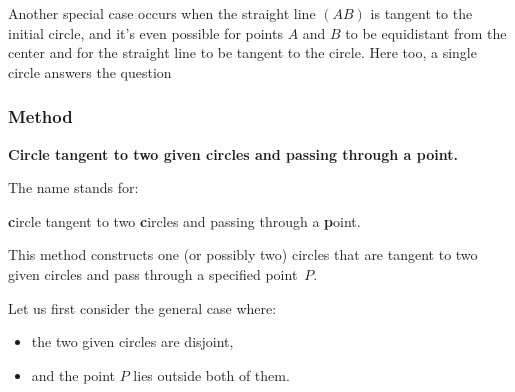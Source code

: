 Another special case occurs when the straight line $(AB)$ is tangent to the initial circle, and it's even possible for points $A$ and $B$ to be equidistant from the center and for the straight line to be tangent to the circle. Here too, a single circle answers the question

\begin{minipage}{.5\textwidth}
\end{minipage}
\begin{minipage}{.5\textwidth}
\begin{tkzexample}
\end{tkzexample}
\end{minipage}

\subsubsection{Method }
\label{ssub:method_c_cc_p}
\textbf{Circle tangent to two given circles and passing through a point.}

\medskip
\noindent
The name  stands for:

\begin{center}
\textbf{c}ircle tangent to two \textbf{c}ircles and passing through a \textbf{p}oint.
\end{center}

\medskip
\noindent
This method constructs one (or possibly two) circles that are tangent to two given circles and pass through a specified point~$P$.

\medskip
\noindent
Let us first consider the general case where:
\begin{itemize}
  \item the two given circles are disjoint,
  \item and the point $P$ lies outside both of them.
\end{itemize}

